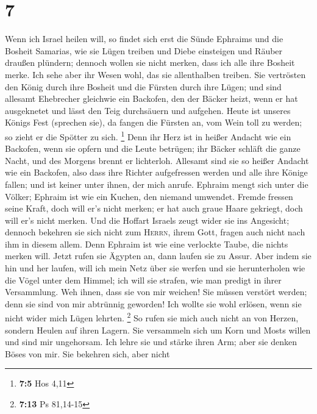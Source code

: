 \hypertarget{section-3}{%
\section{7}\label{section-3}}

 Wenn ich Israel heilen will, so findet sich erst die
Sünde Ephraims und die Bosheit Samarias, wie sie Lügen treiben und Diebe
einsteigen und Räuber draußen plündern;  dennoch wollen
sie nicht merken, dass ich alle ihre Bosheit merke. Ich sehe aber ihr
Wesen wohl, das sie allenthalben treiben.  Sie vertrösten
den König durch ihre Bosheit und die Fürsten durch ihre Lügen;
 und sind allesamt Ehebrecher gleichwie ein Backofen, den
der Bäcker heizt, wenn er hat ausgeknetet und lässt den Teig durchsäuern
und aufgehen.  Heute ist unseres Königs Fest (sprechen
sie), da fangen die Fürsten an, vom Wein toll zu werden; so zieht er die
Spötter zu sich. \footnote{\textbf{7:5} Hos 4,11}  Denn
ihr Herz ist in heißer Andacht wie ein Backofen, wenn sie opfern und die
Leute betrügen; ihr Bäcker schläft die ganze Nacht, und des Morgens
brennt er lichterloh.  Allesamt sind sie so heißer Andacht
wie ein Backofen, also dass ihre Richter aufgefressen werden und alle
ihre Könige fallen; und ist keiner unter ihnen, der mich anrufe.
 Ephraim mengt sich unter die Völker; Ephraim ist wie ein
Kuchen, den niemand umwendet.  Fremde fressen seine Kraft,
doch will er's nicht merken; er hat auch graue Haare gekriegt, doch will
er's nicht merken.  Und die Hoffart Israels zeugt wider
sie ins Angesicht; dennoch bekehren sie sich nicht zum \textsc{Herrn},
ihrem Gott, fragen auch nicht nach ihm in diesem allem. 
Denn Ephraim ist wie eine verlockte Taube, die nichts merken will. Jetzt
rufen sie Ägypten an, dann laufen sie zu Assur.  Aber
indem sie hin und her laufen, will ich mein Netz über sie werfen und sie
herunterholen wie die Vögel unter dem Himmel; ich will sie strafen, wie
man predigt in ihrer Versammlung.  Weh ihnen, dass sie
von mir weichen! Sie müssen verstört werden; denn sie sind von mir
abtrünnig geworden! Ich wollte sie wohl erlösen, wenn sie nicht wider
mich Lügen lehrten. \footnote{\textbf{7:13} Ps 81,14-15} 
So rufen sie mich auch nicht an von Herzen, sondern Heulen auf ihren
Lagern. Sie versammeln sich um Korn und Mosts willen und sind mir
ungehorsam.  Ich lehre sie und stärke ihren Arm; aber sie
denken Böses von mir.  Sie bekehren sich, aber nicht
